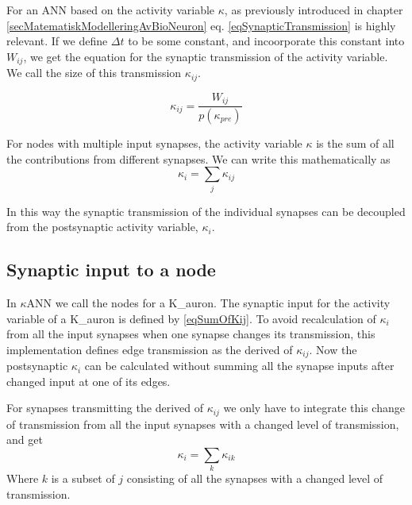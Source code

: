 			For an ANN based on the activity variable $\kappa$, as previously introduced in chapter \ref{secMatematiskModelleringAvBioNeuron} %
			eq. \eqref{eqSynapticTransmission} is highly relevant.  %
			If we define $\Delta t$ to be some constant, and incoorporate this constant into $W_{ij}$, we get the equation for the synaptic transmission of the activity variable.
			We call the size of this transmission $\kappa_{ij}$.

			\begin{equation}
				\label{eqSynapticTransmissionForKANN}
				\kappa_{ij} = \frac{ W_{ij} }{ p(\kappa_{pre})}
			\end{equation}

			For nodes with multiple input synapses, the activity variable $\kappa$ is the sum of all the contributions from different synapses. %
			We can write this mathematically as 
			\begin{equation}
				\label{eqSumOfKij}
				\kappa_i = \sum_j{\kappa_{ij}}
			\end{equation}

			In this way the synaptic transmission of the individual synapses can be decoupled from the postsynaptic activity variable, $\kappa_i$.
			
		\subsection{Synaptic input to a node}
			\label{ssecSynInputToANode}
			In $\kappa$ANN we call the nodes for a K\_auron.
			The synaptic input for the activity variable of a K\_auron is defined by \eqref{eqSumOfKij}.
			To avoid recalculation of $\kappa_i$ from all the input synapses when one synapse changes its transmission, this implementation defines edge transmission as the derived of $\kappa_{ij}$.
			Now the postsynaptic $\kappa_i$ can be calculated without summing all the synapse inputs after changed input at one of its edges.

			For synapses transmitting the derived of $\kappa_{ij}$ we only have to integrate this change of transmission from all the input synapses with a changed level of transmission, and get
			\begin{equation}
				\kappa_i = \sum_k{\kappa_{ik}}
			\end{equation}
			Where ${k}$ is a subset of ${j}$ consisting of all the synapses with a changed level of transmission.

